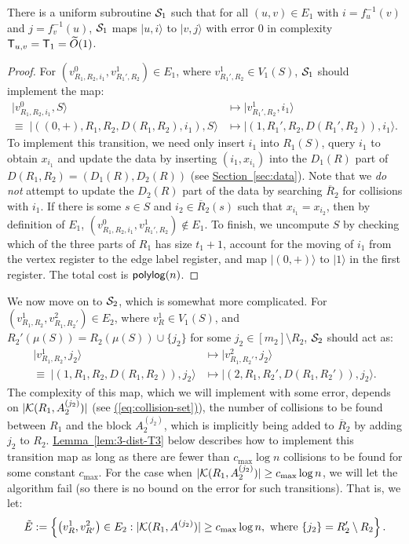 \documentclass{article}
\newcommand{\eq}[1]{\hyperref[eq:#1]{(\ref*{eq:#1})}}
\renewcommand{\sec}[1]{\hyperref[sec:#1]{Section~\ref*{sec:#1}}}
\newcommand{\lem}[1]{\hyperref[lem:#1]{Lemma~\ref*{lem:#1}}}
\def\ket#1{{\lvert}#1\rangle}
\renewcommand{\>}{\rangle}
\newcommand{\<}{\langle}
\renewcommand{\(}{\left(}
\renewcommand{\)}{\right)}
\begin{document}
\begin{lemma}\label{lem:3-dist-T2}
There is a uniform subroutine ${\cal S}_1$ such that for all $(u,v)\in E_1$ with $i=f_u^{-1}(v)$ and $j=f_v^{-1}(u)$, ${\cal S}_1$ maps $\ket{u,i}$ to $\ket{v,j}$ with error 0 in complexity ${\sf T}_{u,v}={\sf T}_1=\widetilde{O}(1)$.
\end{lemma}
\begin{proof}
For $(v^0_{R_1,R_2,i_1},v^1_{R_1',R_2})\in E_1$, where $v^1_{R_1',R_2}\in V_1(S)$, ${\cal S}_1$ should implement the map:
\begin{align*}
\ket{v^0_{R_1,R_2,i_1},S} &\mapsto \ket{v^1_{R_1',R_2},i_1}\\
\equiv \; 
\ket{((0,+),R_1,R_2,D(R_1,R_2),i_1),S} &\mapsto \ket{(1,R_1',R_2,D(R_1',R_2)),i_1}.
\end{align*}
To implement this transition, we need only insert $i_1$ into $R_1(S)$, query $i_1$ to obtain $x_{i_1}$ and update the data by inserting $(i_1,x_{i_1})$ into the $D_1(R)$ part of $D(R_1,R_2)=(D_1(R),D_2(R))$ (see \sec{data}). Note that we \emph{do not} attempt to update the $D_2(R)$ part of the data by searching $\overline{R}_2$ for collisions with $i_1$.
If there is some $s\in S$ and $i_2\in \overline{R}_2(s)$ such that $x_{i_1}=x_{i_2}$, then by definition of $E_1$, $(v^0_{R_1,R_2,i_1},v^1_{R_1',R_2})\not\in E_1$. 
To finish, we uncompute $S$ by checking which of the three parts of $R_1$ has size $t_1+1$, account for the moving of $i_1$ from the vertex register to the edge label register, and map $\ket{(0,+)}$ to $\ket{1}$ in the first register. The total cost is ${\sf polylog}(n)$. 
\end{proof}

We now move on to ${\cal S}_2$, which is somewhat more complicated. For $(v^1_{R_1,R_2},v^2_{R_1,R_2'})\in E_2$,  where $v^1_R\in V_1(S)$, and $R_2'(\mu(S))=R_2(\mu(S))\cup\{j_2\}$ for some $j_2\in [m_2]\setminus R_2$, ${\cal S}_2$ should act as:
\begin{equation}
\begin{split}
\ket{v^1_{R_1,R_2},j_2} &\mapsto \ket{v^2_{R_1,R_2'},j_2}\\
\equiv \; 
\ket{(1,R_1,R_2,D(R_1,R_2)),j_2} &\mapsto \ket{(2,R_1,R_2',D(R_1,R_2')),j_2}.
\end{split}\label{eq:T3}
\end{equation}
The complexity of this map, which we will implement with some error, depends on  $|{\cal K}({R}_1,A_2^{(j_2)})|$ (see \eq{collision-set}), the number of collisions to be found between $R_1$ and the block $A_2^{(j_2)}$, which is implicitly being added to $\overline{R}_2$ by adding $j_2$ to $R_2$. 
\lem{3-dist-T3} below describes how to implement this transition map as long as there are fewer than $c_{\max}\log n$ collisions to be found for some constant $c_{\max}$. 
For the case when $|{\cal K}({R}_1,A_2^{(j_2)})|\geq c_{\max}\log n$, we will let the algorithm fail (so there is no bound on the error for such transitions). That is, we let:
\begin{equation}
\tilde{E}:=\left\{\left(v^1_{R},v^2_{R'}\right)\in E_2: |{\cal K}(R_1,A^{(j_2)})|\geq c_{\max}\log n,
\mbox{ where }\{j_2\}=R_2'\setminus R_2\right\}.\label{eq:3-dist-tilde-E}
\end{equation}
\end{document}
